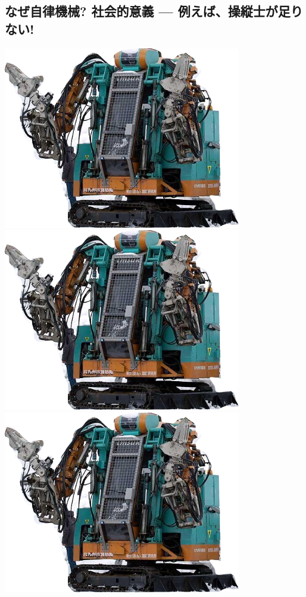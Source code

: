 \subsection{なぜ自律機械? 社会的意義 --- 例えば、操縦士が足りない!}
\label{sec:orgheadline10}

\begin{container-fluid}
\begin{row-fluid}
\begin{span2}
\includegraphics{img/rescue.png}
\includegraphics{img/rescue.png}
\includegraphics{img/rescue.png}

\end{span2}
\end{row-fluid}
\end{container-fluid}
